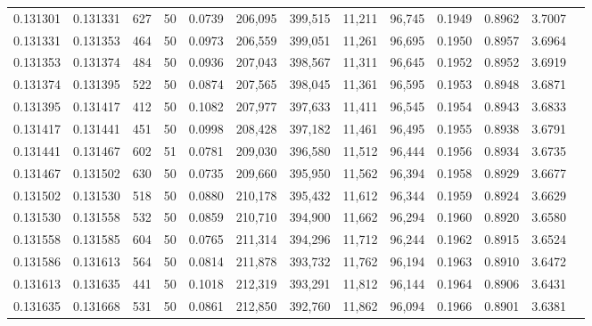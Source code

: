 \begin{tabular}{rrrrrrrrrrrrr}
0.131301 & 0.131331 &   627 &  50 &                                     0.0739 & 206,095 & 399,515 &  11,211 &  96,745 & 0.1949 & 0.8962 & 3.7007 \\
0.131331 & 0.131353 &   464 &  50 &                                     0.0973 & 206,559 & 399,051 &  11,261 &  96,695 & 0.1950 & 0.8957 & 3.6964 \\
0.131353 & 0.131374 &   484 &  50 &                                     0.0936 & 207,043 & 398,567 &  11,311 &  96,645 & 0.1952 & 0.8952 & 3.6919 \\
0.131374 & 0.131395 &   522 &  50 &                                     0.0874 & 207,565 & 398,045 &  11,361 &  96,595 & 0.1953 & 0.8948 & 3.6871 \\
0.131395 & 0.131417 &   412 &  50 &                                     0.1082 & 207,977 & 397,633 &  11,411 &  96,545 & 0.1954 & 0.8943 & 3.6833 \\
0.131417 & 0.131441 &   451 &  50 &                                     0.0998 & 208,428 & 397,182 &  11,461 &  96,495 & 0.1955 & 0.8938 & 3.6791 \\
0.131441 & 0.131467 &   602 &  51 &                                     0.0781 & 209,030 & 396,580 &  11,512 &  96,444 & 0.1956 & 0.8934 & 3.6735 \\
0.131467 & 0.131502 &   630 &  50 &                                     0.0735 & 209,660 & 395,950 &  11,562 &  96,394 & 0.1958 & 0.8929 & 3.6677 \\
0.131502 & 0.131530 &   518 &  50 &                                     0.0880 & 210,178 & 395,432 &  11,612 &  96,344 & 0.1959 & 0.8924 & 3.6629 \\
0.131530 & 0.131558 &   532 &  50 &                                     0.0859 & 210,710 & 394,900 &  11,662 &  96,294 & 0.1960 & 0.8920 & 3.6580 \\
0.131558 & 0.131585 &   604 &  50 &                                     0.0765 & 211,314 & 394,296 &  11,712 &  96,244 & 0.1962 & 0.8915 & 3.6524 \\
0.131586 & 0.131613 &   564 &  50 &                                     0.0814 & 211,878 & 393,732 &  11,762 &  96,194 & 0.1963 & 0.8910 & 3.6472 \\
0.131613 & 0.131635 &   441 &  50 &                                     0.1018 & 212,319 & 393,291 &  11,812 &  96,144 & 0.1964 & 0.8906 & 3.6431 \\
0.131635 & 0.131668 &   531 &  50 &                                     0.0861 & 212,850 & 392,760 &  11,862 &  96,094 & 0.1966 & 0.8901 & 3.6381 \\

\end{tabular}
